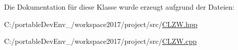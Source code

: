 Die Dokumentation für diese Klasse wurde erzeugt aufgrund der Dateien\+:\begin{DoxyCompactItemize}
\item 
C\+:/portable\+Dev\+Env\+\_/workspace2017/project/src/\hyperlink{_c_l_z_w_8hpp}{C\+L\+Z\+W.\+hpp}\item 
C\+:/portable\+Dev\+Env\+\_/workspace2017/project/src/\hyperlink{_c_l_z_w_8cpp}{C\+L\+Z\+W.\+cpp}\end{DoxyCompactItemize}

